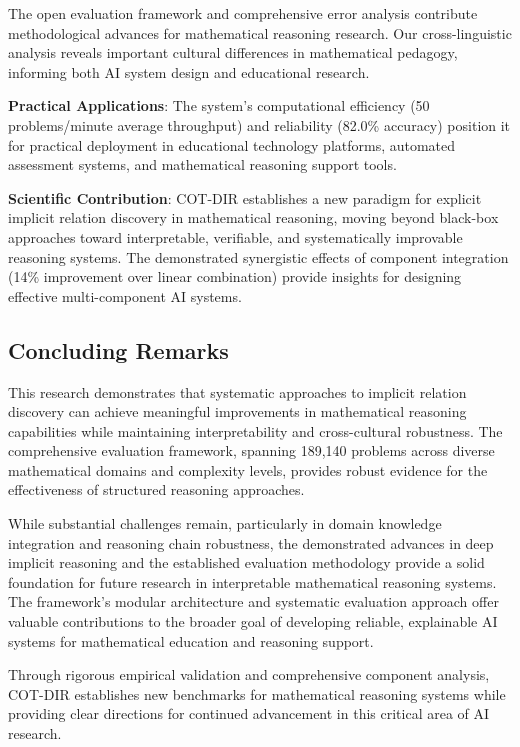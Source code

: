 The open evaluation framework and comprehensive error analysis contribute methodological advances for mathematical reasoning research. Our cross-linguistic analysis reveals important cultural differences in mathematical pedagogy, informing both AI system design and educational research.

\textbf{Practical Applications}: The system's computational efficiency (50 problems/minute average throughput) and reliability (82.0\% accuracy) position it for practical deployment in educational technology platforms, automated assessment systems, and mathematical reasoning support tools.

\textbf{Scientific Contribution}: COT-DIR establishes a new paradigm for explicit implicit relation discovery in mathematical reasoning, moving beyond black-box approaches toward interpretable, verifiable, and systematically improvable reasoning systems. The demonstrated synergistic effects of component integration (14\% improvement over linear combination) provide insights for designing effective multi-component AI systems.

\subsection{Concluding Remarks}

This research demonstrates that systematic approaches to implicit relation discovery can achieve meaningful improvements in mathematical reasoning capabilities while maintaining interpretability and cross-cultural robustness. The comprehensive evaluation framework, spanning 189,140 problems across diverse mathematical domains and complexity levels, provides robust evidence for the effectiveness of structured reasoning approaches.

While substantial challenges remain, particularly in domain knowledge integration and reasoning chain robustness, the demonstrated advances in deep implicit reasoning and the established evaluation methodology provide a solid foundation for future research in interpretable mathematical reasoning systems. The framework's modular architecture and systematic evaluation approach offer valuable contributions to the broader goal of developing reliable, explainable AI systems for mathematical education and reasoning support.

Through rigorous empirical validation and comprehensive component analysis, COT-DIR establishes new benchmarks for mathematical reasoning systems while providing clear directions for continued advancement in this critical area of AI research. 
